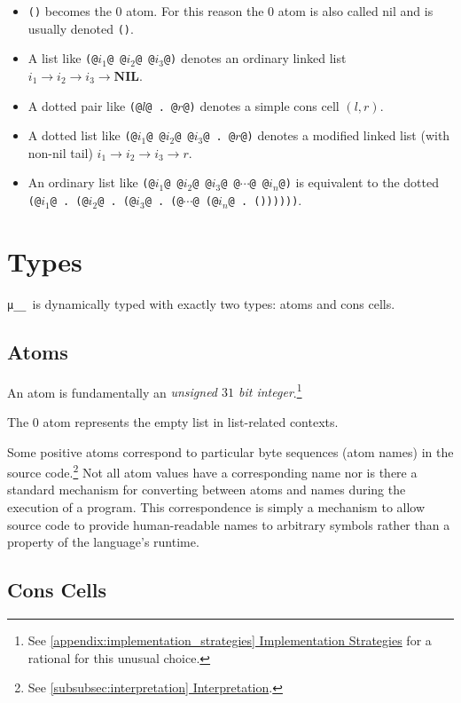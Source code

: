 \documentclass[twocolumn]{report}
\newcommand\muu{\texttt{μ\!\!\!\_\_}}
\newcommand{\intralink}[2]{\hyperref[#1]{\ref*{#1} #2}}
\begin{document}
\begin{itemize}
\item \texttt{()} becomes the $0$ atom.
For this reason the $0$ atom is also called nil and is usually denoted \texttt{()}.
\item A list like \texttt{(@$i_1$@ @$i_2$@ @$i_3$@)} denotes an ordinary linked list $i_1 \rightarrow i_2 \rightarrow i_3 \rightarrow \textbf{NIL}$.
\item A dotted pair like \texttt{(@$l$@ . @$r$@)} denotes a simple cons cell $\left(l, r\right)$.
\item A dotted list like \texttt{(@$i_1$@ @$i_2$@ @$i_3$@ . @$r$@)} denotes a modified linked list (with non-nil tail) $i_1 \rightarrow i_2 \rightarrow i_3 \rightarrow r$.
\item An ordinary list like \texttt{(@$i_1$@ @$i_2$@ @$i_3$@ @$\cdots$@ @$i_n$@)} is equivalent to the dotted \texttt{(@$i_1$@ . (@$i_2$@ . (@$i_3$@ . (@$\cdots$@ (@$i_n$@ . ())))))}.
\end{itemize}

\section{Types}
\label{sec:types}

\muu \ is dynamically typed with exactly two types: atoms and cons cells.

\subsection{Atoms}
\label{subsec:atoms}

An atom is fundamentally an \emph{unsigned $31$ bit integer}.\footnote{See \intralink{appendix:implementation_strategies}{Implementation Strategies} for a rational for this unusual choice.}

The $0$ atom represents the empty list in list-related contexts.

Some positive atoms correspond to particular byte sequences (atom names) in the source code.\footnote{See \intralink{subsubsec:interpretation}{Interpretation}.}
Not all atom values have a corresponding name nor is there a standard mechanism for converting between atoms and names during the execution of a program. This correspondence is simply a mechanism to allow source code to provide human-readable names to arbitrary symbols rather than a property of the language's runtime.

\subsection{Cons Cells}
\label{subsec:cons_cells}
\end{document}
